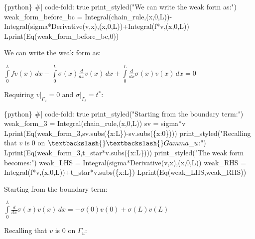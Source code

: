 \documentclass[
  11pt,
  a4paper,
]{scrbook}
\newenvironment{Shaded}{\begin{snugshade}}{\end{snugshade}}
\newcommand{\InformationTok}[1]{\textcolor[rgb]{0.37,0.37,0.37}{#1}}
\begin{document}
\begin{Shaded}
\begin{Highlighting}[]
\InformationTok{\textasciigrave{}\textasciigrave{}\textasciigrave{}\{python\}}
\InformationTok{\#| code{-}fold: true}
\InformationTok{print\_styled("We can write the weak form as:")}
\InformationTok{weak\_form\_before\_bc = Integral(chain\_rule,(x,0,L)){-}Integral(sigma*Derivative(v,x),(x,0,L))+Integral(f*v,(x,0,L))}
\InformationTok{Lprint(Eq(weak\_form\_before\_bc,0))}
\InformationTok{\textasciigrave{}\textasciigrave{}\textasciigrave{}}
\end{Highlighting}
\end{Shaded}

We can write the weak form as:

$\displaystyle \int\limits_{0}^{L} f v{\left(x \right)}\, dx - \int\limits_{0}^{L} \sigma{\left(x \right)} \frac{d}{d x} v{\left(x \right)}\, dx + \int\limits_{0}^{L} \frac{d}{d x} \sigma{\left(x \right)} v{\left(x \right)}\, dx = 0$

Requiring \(v|_{\Gamma_u}=0\) and \(\sigma|_{\Gamma_t}=t^*\):

\begin{Shaded}
\begin{Highlighting}[]
\InformationTok{\textasciigrave{}\textasciigrave{}\textasciigrave{}\{python\}}
\InformationTok{\#| code{-}fold: true}
\InformationTok{print\_styled("Starting from the boundary term:")}
\InformationTok{weak\_form\_3 = Integral(chain\_rule,(x,0,L))}
\InformationTok{sv = sigma*v}
\InformationTok{Lprint(Eq(weak\_form\_3,sv.subs(\{x:L\}){-}sv.subs(\{x:0\})))}
\InformationTok{print\_styled("Recalling that $v$ is 0 on $\textbackslash{}\textbackslash{}Gamma\_u$:")}
\InformationTok{Lprint(Eq(weak\_form\_3,t\_star*v.subs(\{x:L\})))}
\InformationTok{print\_styled("The weak form becomes:")}
\InformationTok{weak\_LHS = Integral(sigma*Derivative(v,x),(x,0,L))}
\InformationTok{weak\_RHS = Integral(f*v,(x,0,L))+t\_star*v.subs(\{x:L\})}
\InformationTok{Lprint(Eq(weak\_LHS,weak\_RHS))}
\InformationTok{\textasciigrave{}\textasciigrave{}\textasciigrave{}}
\end{Highlighting}
\end{Shaded}

Starting from the boundary term:

$\displaystyle \int\limits_{0}^{L} \frac{d}{d x} \sigma{\left(x \right)} v{\left(x \right)}\, dx = - \sigma{\left(0 \right)} v{\left(0 \right)} + \sigma{\left(L \right)} v{\left(L \right)}$

Recalling that \(v\) is 0 on \(\Gamma_u\):
\end{document}
